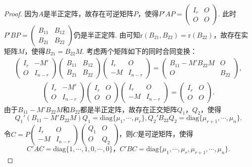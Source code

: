 \documentclass[../../main.tex]{subfiles}
\begin{document}
\begin{proof}
因为\(A\)是半正定阵，故存在可逆矩阵\(P\)，使得\(P'AP=\begin{pmatrix}I_r&O\\O&O\end{pmatrix}\). 此时\(P'BP=\begin{pmatrix}B_{11}&B_{12}\\B_{21}&B_{22}\end{pmatrix}\)仍是半正定阵. 由可知\(\mathrm{r}(B_{21},B_{22})=\mathrm{r}(B_{22})\)，故存在实矩阵\(M\)，使得\(B_{21}=B_{22}M\). 考虑两个矩阵如下的同时合同变换：
\begin{align*}
\begin{pmatrix}I_r&-M'\\O&I_{n - r}\end{pmatrix}\begin{pmatrix}B_{11}&B_{12}\\B_{21}&B_{22}\end{pmatrix}\begin{pmatrix}I_r&O\\-M&I_{n - r}\end{pmatrix}=\begin{pmatrix}B_{11}-M'B_{22}M&O\\O&B_{22}\end{pmatrix},
\end{align*}
\begin{align*}
\begin{pmatrix}I_r&-M'\\O&I_{n - r}\end{pmatrix}\begin{pmatrix}I_r&O\\O&O\end{pmatrix}\begin{pmatrix}I_r&O\\-M&I_{n - r}\end{pmatrix}=\begin{pmatrix}I_r&O\\O&O\end{pmatrix}.
\end{align*}
由于\(B_{11}-M'B_{22}M\)和\(B_{22}\)都是半正定阵，故存在正交矩阵\(Q_1\)，\(Q_2\)，使得
\[
Q_1'(B_{11}-M'B_{22}M)Q_1 = \mathrm{diag}\{\mu_1,\cdots,\mu_r\},
Q_2'B_{22}Q_2 = \mathrm{diag}\{\mu_{r + 1},\cdots,\mu_n\}.
\]
令\(C = P\begin{pmatrix}I_r&O\\-M&I_{n - r}\end{pmatrix}\begin{pmatrix}Q_1&O\\O&Q_2\end{pmatrix}\)，则\(C\)是可逆矩阵，使得
\[
C'AC = \mathrm{diag}\{1,\cdots,1,0,\cdots,0\}，
C'BC = \mathrm{diag}\{\mu_1,\cdots,\mu_r,\mu_{r + 1},\cdots,\mu_n\}. 
\]
\end{proof}
\end{document}

